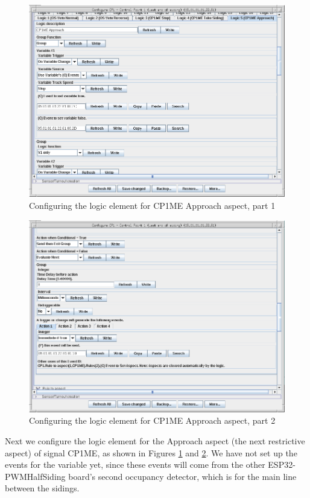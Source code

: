 \clearpage
\begin{figure}[hbpt]\begin{centering}%
\includegraphics[width=5in]{CP1ME-Approach-Logic-Config1.png}
\caption{Configuring the logic element for CP1ME Approach aspect, part 1}
\label{fig:CP1ME-Approach-Logic-Config1}
\end{centering}\end{figure}
\begin{figure}[hbpt]\begin{centering}%
\includegraphics[width=5in]{CP1ME-Approach-Logic-Config2.png}
\caption{Configuring the logic element for CP1ME Approach aspect, part 2}
\label{fig:CP1ME-Approach-Logic-Config2}
\end{centering}\end{figure}
Next we configure the logic element for the Approach aspect (the next 
restrictive aspect) of signal CP1ME, as shown in Figures 
\ref{fig:CP1ME-Approach-Logic-Config1} and 
\ref{fig:CP1ME-Approach-Logic-Config2}. We have not set up the events for the 
variable yet, since these events will come from the other ESP32-PWMHalfSiding 
board's second occupancy detector, which is for the main line between the 
sidings.

